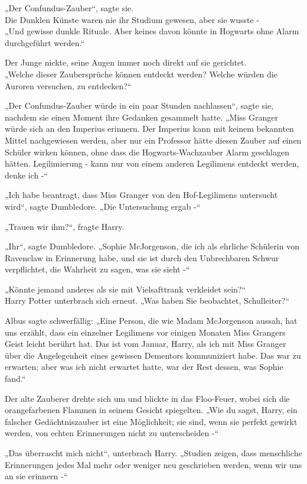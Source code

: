 {„Der Confundus-Zauber“, sagte sie.\\ Die Dunklen Künste waren nie ihr Studium gewesen, aber sie wusste -\\ „Und gewisse dunkle Rituale. Aber keines davon könnte in Hogwarts ohne Alarm durchgeführt werden.“

Der Junge nickte, seine Augen immer noch direkt auf sie gerichtet.\\ „Welche dieser Zaubersprüche können entdeckt werden? Welche würden die Auroren versuchen, zu entdecken?“

„Der Confundus-Zauber würde in ein paar Stunden nachlassen“, sagte sie, nachdem sie einen Moment ihre Gedanken gesammelt hatte. „Miss Granger würde sich an den Imperius erinnern. Der Imperius kann mit keinem bekannten Mittel nachgewiesen werden, aber nur ein Professor hätte diesen Zauber auf einen Schüler wirken können, ohne dass die Hogwarts-Wachzauber Alarm geschlagen hätten. Legilimierung - kann nur von einem anderen Legilimens entdeckt werden, denke ich -“

„Ich habe beantragt, dass Miss Granger von den Hof-Legilimens untersucht wird“, sagte Dumbledore. „Die Untersuchung ergab -“

„Trauen wir ihm?“, fragte Harry.

„Ihr“, sagte Dumbledore. „Sophie McJorgenson, die ich als ehrliche Schülerin von Ravenclaw in Erinnerung habe, und sie ist durch den Unbrechbaren Schwur verpflichtet, die Wahrheit zu sagen, was sie sieht -“

„Könnte jemand anderes als sie mit Vielsafttrank verkleidet sein?“\\ Harry Potter unterbrach sich erneut. „Was haben Sie beobachtet, Schulleiter?“

Albus sagte schwerfällig: „Eine Person, die wie Madam McJorgenson aussah, hat uns erzählt, dass ein einzelner Legilimens vor einigen Monaten Miss Grangers Geist leicht berührt hat. Das ist vom Januar, Harry, als ich mit Miss Granger über die Angelegenheit eines gewissen Dementors kommuniziert habe. Das war zu erwarten; aber was ich nicht erwartet hatte, war der Rest dessen, was Sophie fand.“

Der alte Zauberer drehte sich um und blickte in das Floo-Feuer, wobei sich die orangefarbenen Flammen in seinem Gesicht spiegelten. „Wie du sagst, Harry, ein falscher Gedächtniszauber ist eine Möglichkeit; sie sind, wenn sie perfekt gewirkt werden, von echten Erinnerungen nicht zu unterscheiden -“

„Das überrascht mich nicht“, unterbrach Harry. „Studien zeigen, dass menschliche Erinnerungen jedes Mal mehr oder weniger neu geschrieben werden, wenn wir uns an sie erinnern -“

}
